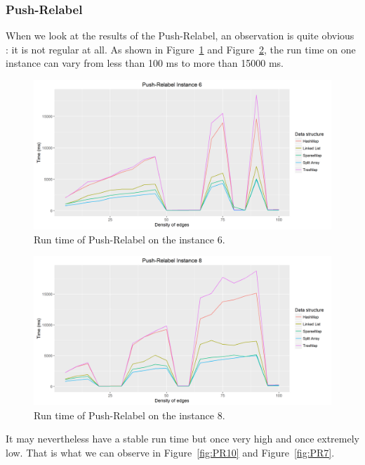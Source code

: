 \subsubsection{Push-Relabel}
When we look at the results of the Push-Relabel, an observation is quite obvious : it is not regular at all. As shown in Figure~\ref{fig:PR6} and Figure~\ref{fig:PR8}, the run time on one instance can vary from less than 100 ms to more than 15000 ms.

\begin{figure}[H]
\includegraphics[scale=0.63]{images/PR6.png}
\caption{Run time of Push-Relabel on the instance 6.}
\label{fig:PR6}
\end{figure}
\begin{figure}[H]
\includegraphics[scale=0.63]{images/PR8.png}
\caption{Run time of Push-Relabel on the instance 8.}
\label{fig:PR8}
\end{figure}

It may nevertheless have a stable run time but once very high and once extremely low. That is what we can observe in Figure~\ref{fig:PR10} and Figure~\ref{fig:PR7}.

